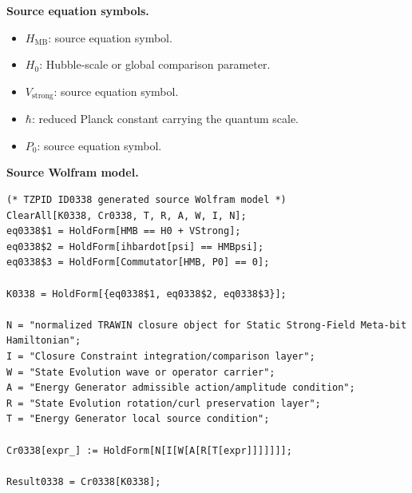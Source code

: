 \begin{minipage}[t]{0.49\linewidth}
\begingroup
\small
\raggedright
\textbf{Source equation symbols.}\par
\begin{itemize}[leftmargin=1.35em,itemsep=1pt,topsep=1pt,parsep=0pt]
    \item $H_{\mathrm{MB}}$: source equation symbol.
    \item $H_{0}$: Hubble-scale or global comparison parameter.
    \item $V_{\mathrm{strong}}$: source equation symbol.
    \item $\hbar$: reduced Planck constant carrying the quantum scale.
    \item $P_{0}$: source equation symbol.
\end{itemize}
\endgroup
\end{minipage}\hfill
\begin{minipage}[t]{0.47\linewidth}
\begingroup
\scriptsize
\raggedright
\textbf{Source Wolfram model.}\par
\begin{Verbatim}[fontsize=\tiny,breaklines=true,breakanywhere=true]
(* TZPID ID0338 generated source Wolfram model *)
ClearAll[K0338, Cr0338, T, R, A, W, I, N];
eq0338$1 = HoldForm[HMB == H0 + VStrong];
eq0338$2 = HoldForm[ihbardot[psi] == HMBpsi];
eq0338$3 = HoldForm[Commutator[HMB, P0] == 0];

K0338 = HoldForm[{eq0338$1, eq0338$2, eq0338$3}];

N = "normalized TRAWIN closure object for Static Strong-Field Meta-bit Hamiltonian";
I = "Closure Constraint integration/comparison layer";
W = "State Evolution wave or operator carrier";
A = "Energy Generator admissible action/amplitude condition";
R = "State Evolution rotation/curl preservation layer";
T = "Energy Generator local source condition";

Cr0338[expr_] := HoldForm[N[I[W[A[R[T[expr]]]]]]];

Result0338 = Cr0338[K0338];
\end{Verbatim}
\endgroup
\end{minipage}


